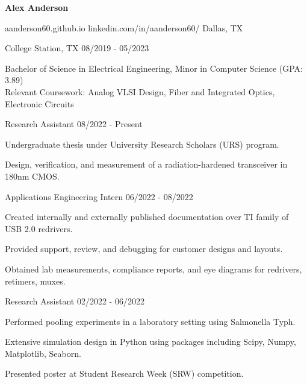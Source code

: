 \documentclass[11pt]{article}
\begin{document}
\centerline{{\Huge \bf Alex Anderson}}

\bigskip

        {aanderson60.github.io}
        {linkedin.com/in/aanderson60/}
        {Dallas, TX}


\begin{description}
\squish
{}
            {College Station, TX}
            {08/2019 - 05/2023}

Bachelor of Science in Electrical Engineering, Minor in Computer Science (GPA: 3.89) \\
Relevant Coursework: Analog VLSI Design, Fiber and Integrated Optics, Electronic Circuits

\end{description}


\begin{description}
\squish
{}
            {Research Assistant}
            {08/2022 - Present}

\textbullet \space Undergraduate thesis under University Research Scholars (URS) program.

\textbullet \space Design, verification, and measurement of a radiation-hardened transceiver in 180nm CMOS.


\end{description}

\begin{description}
\squish
{}
            {Applications Engineering Intern}
            {06/2022 - 08/2022}

\textbullet \space Created internally and externally published documentation over TI family of USB 2.0 redrivers.

\textbullet \space Provided support, review, and debugging for customer designs and layouts. 

\textbullet \space Obtained lab measurements, compliance reports, and eye diagrams for redrivers, retimers, muxes.
      
\end{description}

\begin{description}
\squish
{}
            {Research Assistant}
            {02/2022 - 06/2022}

\textbullet \space Performed pooling experiments in a laboratory setting using Salmonella Typh.

\textbullet \space Extensive simulation design in Python using packages including Scipy, Numpy, Matplotlib, Seaborn.

\textbullet \space Presented poster at Student Research Week (SRW) competition.

\end{description}
\end{document}
